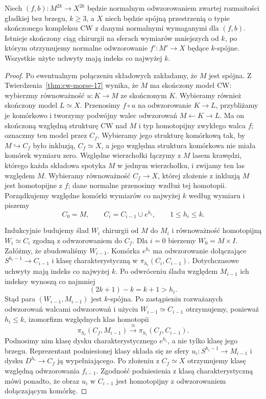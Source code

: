 \begin{stwierdzenie}
\label{prop:skonczona-redukcja-Wall-22}
Niech $(f,b):M^{2k}\to X^{2k}$ będzie normalnym
odwzorowaniem zwartej rozmaitości gładkiej
bez brzegu,
$k\geq3$, a $X$ niech będzie spójną
przestrzenią o typie skończonego kompleksu
CW z danymi normalnymi wymaganymi dla $(f,b)$.
Istnieje skończony
ciąg chirurgii na sferach wymiarów mniejszych
od $k$, po którym otrzymujemy normalne
odwzorowanie $f':M'\to X$ będące
$k$-spójne. Wszystkie użyte uchwyty mają
indeks co najwyżej $k$.
\end{stwierdzenie}
\begin{proof}
Po ewentualnym połączeniu składowych zakładamy,
że $M$ jest spójna. Z
Twierdzenia~\ref{thm:cw-morse-17} wynika,
że $M$ ma skończony model CW: wybierzmy
równoważność $u:K\to M$ ze skończonym $K$.
Wybieramy również skończony model $L\simeq X$.
Przenosimy $f\circ u$ na odwzorowanie $K\to L$,
przybliżamy je komórkowo i tworzymy
podwójny walec odwzorowań
$M\leftarrow K\to L$. Ma on skończoną
względną strukturę CW nad $M$ i typ
homotopijny zwykłego walca $f$;
oznaczmy ten model przez $C_f$. Wybieramy
jego strukturę komórkową tak, by
$M\hookrightarrow C_f$ było inkluzją,
$C_f\simeq X$, a jego względna struktura
komórkowa nie miała komórek wymiaru zero.
Względne wierzchołki łączymy z $M$
lasem krawędzi, którego każda składowa
spotyka $M$ w jednym wierzchołku,
i zwijamy ten las względem $M$. Wybieramy
równoważność $C_f\to X$, której złożenie
z inkluzją $M$ jest homotopijne z $f$;
dane normalne przenosimy wzdłuż tej homotopii.
Porządkujemy względne komórki wymiarów
co najwyżej $k$ według wymiaru i piszemy
\[
 C_0=M,\qquad C_i=C_{i-1}\cup e^{h_i},
 \qquad 1\leq h_i\leq k.
\]

Indukcyjnie budujemy ślad $W_i$ chirurgii
od $M$ do $M_i$ i równoważność homotopijną
$W_i\simeq C_i$ zgodną z odwzorowaniem do
$C_f$. Dla $i=0$ bierzemy $W_0=M\times I$.
Załóżmy, że zbudowaliśmy $W_{i-1}$.
Komórka $e^{h_i}$ ma odwzorowanie dołączające
$S^{h_i-1}\to C_{i-1}$ i klasę
charakterystyczną w
$\pi_{h_i}(C_i,C_{i-1})$. Dotychczasowe
uchwyty mają indeks co najwyżej $k$.
Po odwróceniu śladu względem $M_{i-1}$
ich indeksy wynoszą co najmniej
\[
 (2k+1)-k=k+1>h_i.
\]
Stąd para $(W_{i-1},M_{i-1})$ jest
$k$-spójna. Po zastąpieniu rozważanych
odwzorowań walcami odwzorowań i użyciu
$W_{i-1}\simeq C_{i-1}$ otrzymujemy,
ponieważ $h_i\leq k$, izomorfizm względnych
klas homotopii
\[
 \pi_{h_i}(C_f,M_{i-1})
 \xrightarrow{\ \cong\ }
 \pi_{h_i}(C_f,C_{i-1}).
\]
Podnosimy nim klasę dysku charakterystycznego
$e^{h_i}$, a nie tylko klasę jego brzegu.
Reprezentant podniesionej klasy składa się
ze sfery $u_i:S^{h_i-1}\to M_{i-1}$
i dysku $D^{h_i}\to C_f$ ją wypełniającego.
Po złożeniu z $C_f\simeq X$ otrzymujemy
klasę względną odwzorowania $f_{i-1}$.
Zgodność podniesienia z klasą
charakterystyczną mówi ponadto, że obraz
$u_i$ w $C_{i-1}$ jest homotopijny
z odwzorowaniem dołączającym komórkę.


\end{proof}
